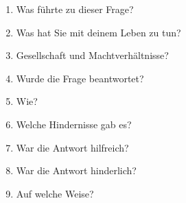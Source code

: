 \begin{enumerate}
    \item Was f\"uhrte zu dieser Frage?
    \item Was hat Sie mit deinem Leben zu tun?
    \item Gesellschaft und Machtverh\"altnisse?
    \item Wurde die Frage beantwortet?
    \item Wie?
    \item Welche Hindernisse gab es?
    \item War die Antwort hilfreich?
    \item War die Antwort hinderlich?
    \item Auf welche Weise?
\end{enumerate}